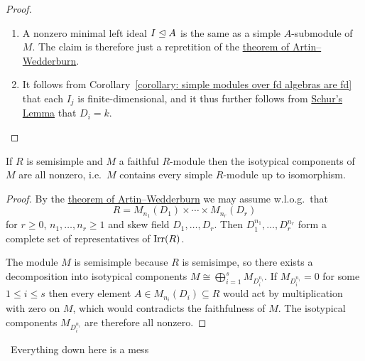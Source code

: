 \begin{proof}
  \leavevmode
  \begin{enumerate}
    \item
      A nonzero minimal left ideal $I \trianglelefteq A$ is the same as a simple $A$-submodule of $M$.
      The claim is therefore just a repretition of the \hyperref[theorem: artin wedderburn theorem]{theorem of Artin--Wedderburn}.
    \item
      It follows from Corollary~\ref{corollary: simple modules over fd algebras are fd} that each $I_j$ is finite-dimensional, and it thus further follows from \hyperref[proposition: schurs lemma for modules]{Schur’s Lemma} that $D_i = k$.
    \qedhere
  \end{enumerate}
\end{proof}


\begin{corollary}
  If $R$ is semisimple and $M$ a faithful $R$-module then the isotypical components of $M$ are all nonzero, i.e.\ $M$ contains every simple $R$-module up to isomorphism.
\end{corollary}


\begin{proof}
  By the \hyperref[theorem: artin wedderburn theorem]{theorem of Artin--Wedderburn} we may assume w.l.o.g.\ that
  \[
    R = M_{n_1}(D_1) \times \dotsb \times M_{n_r}(D_r)
  \]
  for $r \geq 0$, $n_1, \dotsc, n_r \geq 1$ and skew field $D_1, \dotsc, D_r$.
  Then $D_1^{n_1}, \dotsc, D_r^{n_r}$ form a complete set of representatives of $\operatorname{Irr}(R)$.
  
  The module $M$ is semisimple because $R$ is semisimpe, so there exists a decomposition into isotypical components $M \cong \bigoplus_{i=1}^s M_{D_i^{n_i}}$.
  If $M_{D_i^{n_i}} = 0$ for some $1 \leq i \leq s$ then every element $A \in M_{n_i}(D_i) \subseteq R$ would act by multiplication with zero on $M$, which would contradicts the faithfulness of $M$.
  The isotypical components $M_{D_i^{n_i}}$ are therefore all nonzero.
\end{proof}













\hrulefill\, Everything down here is a mess \,\hrulefill












